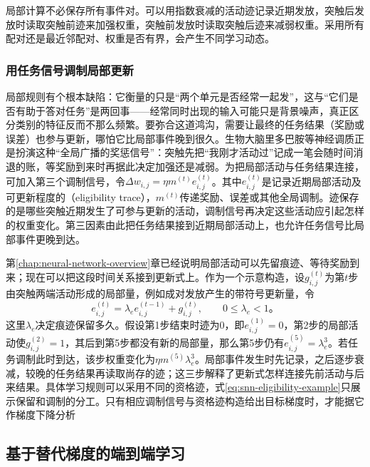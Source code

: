 局部计算不必保存所有事件对。可以用指数衰减的活动迹记录近期发放，突触后发放时读取突触前迹来加强权重，突触前发放时读取突触后迹来减弱权重。采用所有配对还是最近邻配对、权重是否有界，会产生不同学习动态。

\subsubsection{用任务信号调制局部更新}
\label{sec:snn-modulated-learning}

局部规则有个根本缺陷：它衡量的只是“两个单元是否经常一起发”，这与“它们是否有助于答对任务”是两回事——经常同时出现的输入可能只是背景噪声，真正区分类别的特征反而不那么频繁。要弥合这道鸿沟，需要让最终的任务结果（奖励或误差）也参与更新，哪怕它比局部事件晚到很久。生物大脑里多巴胺等神经调质正是扮演这种“全局广播的奖惩信号”：突触先把“我刚才活动过”记成一笔会随时间消退的账，等奖励到来时再据此决定加强还是减弱。为把局部活动与任务结果连接，可加入第三个调制信号，令$\Delta w_{i,j}=\eta m^{(t)}e_{i,j}^{(t)}$。其中$e_{i,j}^{(t)}$是记录近期局部活动及可更新程度的（eligibility trace），$m^{(t)}$传递奖励、误差或其他全局调制。迹保存的是哪些突触近期发生了可参与更新的活动，调制信号再决定这些活动应引起怎样的权重变化。第三因素由此把任务结果接到近期局部活动上，也允许任务信号比局部事件更晚到达。

第\ref{chap:neural-network-overview}章已经说明局部活动可以先留痕迹、等待奖励到来；现在可以把这段时间关系接到更新式上。作为一个示意构造，设$g_{i,j}^{(t)}$为第$t$步由突触两端活动形成的局部量，例如成对发放产生的带符号更新量，令
\begin{equation}
  e_{i,j}^{(t)}=\lambda_e e_{i,j}^{(t-1)}+g_{i,j}^{(t)},
  \qquad 0\leq\lambda_e<1\text{。}
  \label{eq:snn-eligibility-example}
\end{equation}
这里$\lambda_e$决定痕迹保留多久。假设第1步结束时迹为0，即$e_{i,j}^{(1)}=0$，第2步的局部活动使$g_{i,j}^{(2)}=1$，其后到第5步都没有新的局部量，那么第5步仍有$e_{i,j}^{(5)}=\lambda_e^3$。若任务调制此时到达，该步权重变化为$\eta m^{(5)}\lambda_e^3$。局部事件发生时先记录，之后逐步衰减，较晚的任务结果再读取尚存的迹；这三步解释了更新式怎样连接先前活动与后来结果。具体学习规则可以采用不同的资格迹，式\eqref{eq:snn-eligibility-example}只展示保留和调制的分工。只有相应调制信号与资格迹构造给出目标梯度时，才能据它作梯度下降分析

\subsection{基于替代梯度的端到端学习}
\label{sec:snn-surrogate}

